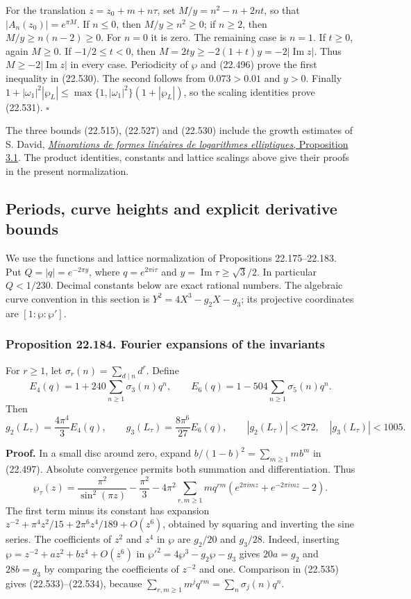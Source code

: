 \documentclass[
  11pt,
  a4paper,
]{article}
\begin{document}
For the translation \(z=z_0+m+n\tau\), set \(M/y=n^2-n+2nt\), so that
\(|A_n(z_0)|=e^{\pi M}\). If \(n\le0\), then \(M/y\ge n^2\ge0\); if
\(n\ge2\), then \(M/y\ge n(n-2)\ge0\). For \(n=0\) it is zero. The
remaining case is \(n=1\). If \(t\ge0\), again \(M\ge0\). If
\(-1/2\le t<0\), then \(M=2ty\ge-2(1+t)y=-2|\operatorname{Im}z|\). Thus
\(M\ge-2|\operatorname{Im}z|\) in every case. Periodicity of \(\wp\) and
(22.496) prove the first inequality in (22.530). The second follows from
\(0.073>0.01\) and \(y>0\). Finally \(1+|\omega_1|^2|\wp_L|\le
\max\{1,|\omega_1|^2\}(1+|\wp_L|)\), so the scaling identities prove
(22.531). \(\square\)

The three bounds (22.515), (22.527) and (22.530) include the growth
estimates of S. David,
\href{https://smf.emath.fr/system/files/filepdf/MSMF_1995_2_62__1_0.pdf}{\emph{Minorations
de formes linéaires de logarithmes elliptiques}, Proposition 3.1}. The
product identities, constants and lattice scalings above give their
proofs in the present normalization.

\subsection{Periods, curve heights and explicit derivative
bounds}\label{periods-curve-heights-and-explicit-derivative-bounds}

We use the functions and lattice normalization of Propositions
22.175--22.183. Put \(Q=|q|=e^{-2\pi y}\), where \(q=e^{2\pi i\tau}\)
and \(y=\operatorname{Im}\tau\ge\sqrt3/2\). In particular \(Q<1/230\).
Decimal constants below are exact rational numbers. The algebraic curve
convention in this section is \(Y^2=4X^3-g_2X-g_3\); its projective
coordinates are \([1:\wp:\wp']\).

\subsubsection{Proposition 22.184. Fourier expansions of the
invariants}\label{proposition-22.184.-fourier-expansions-of-the-invariants}

For \(r\ge1\), let \(\sigma_r(n)=\sum_{d\mid n}d^r\). Define \[
 E_4(q)=1+240\sum_{n\ge1}\sigma_3(n)q^n,
 \qquad
 E_6(q)=1-504\sum_{n\ge1}\sigma_5(n)q^n.
 \tag{22.533}
\] Then \[
 g_2(L_\tau)=\frac{4\pi^4}{3}E_4(q),\qquad
 g_3(L_\tau)=\frac{8\pi^6}{27}E_6(q),
 \qquad |g_2(L_\tau)|<272,\quad |g_3(L_\tau)|<1005.
 \tag{22.534}
\]

\textbf{Proof.} In a small disc around zero, expand
\(b/(1-b)^2=\sum_{m\ge1}mb^m\) in (22.497). Absolute convergence permits
both summation and differentiation. Thus \[
 \wp_\tau(z)=\frac{\pi^2}{\sin^2(\pi z)}-\frac{\pi^2}{3}
 -4\pi^2\sum_{r,m\ge1}m q^{rm}
       (e^{2\pi imz}+e^{-2\pi imz}-2).
 \tag{22.535}
\] The first term minus its constant has expansion
\(z^{-2}+\pi^4z^2/15+2\pi^6z^4/189+O(z^6)\), obtained by squaring and
inverting the sine series. The coefficients of \(z^2\) and \(z^4\) in
\(\wp\) are \(g_2/20\) and \(g_3/28\). Indeed, inserting
\(\wp=z^{-2}+az^2+bz^4+O(z^6)\) in \(\wp'^2=4\wp^3-g_2\wp-g_3\) gives
\(20a=g_2\) and \(28b=g_3\) by comparing the coefficients of \(z^{-2}\)
and one. Comparison in (22.535) gives (22.533)--(22.534), because
\(\sum_{r,m\ge1}m^j q^{rm}=\sum_n\sigma_j(n)q^n\).
\end{document}
